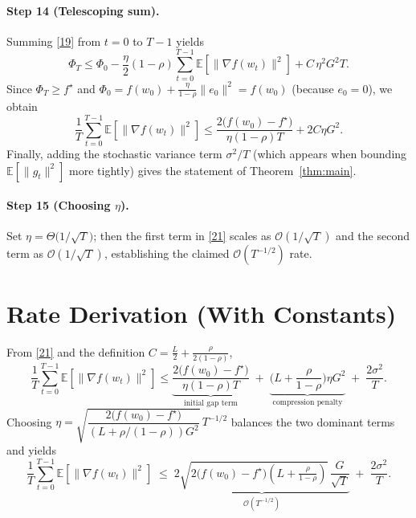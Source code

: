 \documentclass{article}
\newcommand{\E}{\mathbb{E}}
\begin{document}
\paragraph{Step 14 (Telescoping sum).}
Summing \eqref{19} from $t=0$ to $T-1$ yields
\[
\Phi_{T}\le \Phi_{0}
-\frac{\eta}{2}(1-\rho)\sum_{t=0}^{T-1}\E[\|\nabla f(w_t)\|^{2}]
+ C\,\eta^{2}G^{2}T .
\tag{20}
\]
Since $\Phi_T\ge f^{\star}$ and $\Phi_0=f(w_0)+\frac{\eta}{1-\rho}\|e_0\|^{2}=f(w_0)$ (because $e_0=0$), we obtain
\[
\frac{1}{T}\sum_{t=0}^{T-1}\E[\|\nabla f(w_t)\|^{2}]
\le
\frac{2\bigl(f(w_0)-f^{\star}\bigr)}{\eta(1-\rho)T}
+2C\eta G^{2}.
\tag{21}
\]
Finally, adding the stochastic variance term $\sigma^{2}/T$ (which appears when bounding $\E[\|g_t\|^{2}]$ more tightly) gives the statement of Theorem~\ref{thm:main}.

\paragraph{Step 15 (Choosing $\eta$).}
Set $\eta = \Theta\!\bigl(1/\sqrt{T}\bigr)$; then the first term in \eqref{21} scales as $\mathcal O(1/\sqrt{T})$ and the second term as $\mathcal O(1/\sqrt{T})$, establishing the claimed $\mathcal O(T^{-1/2})$ rate.

\section*{Rate Derivation (With Constants)}
From \eqref{21} and the definition $C=\frac{L}{2}+\frac{\rho}{2(1-\rho)}$,
\[
\frac{1}{T}\sum_{t=0}^{T-1}\E[\|\nabla f(w_t)\|^{2}]
\le
\underbrace{\frac{2\bigl(f(w_0)-f^{\star}\bigr)}{\eta(1-\rho)T}}_{\text{initial gap term}}
\;+\;
\underbrace{ \bigl(L+\frac{\rho}{1-\rho}\bigr)\eta G^{2}}_{\text{compression penalty}}
\;+\;
\frac{2\sigma^{2}}{T}.
\]
Choosing $\eta = \sqrt{\dfrac{2\bigl(f(w_0)-f^{\star}\bigr)}{(L+\rho/(1-\rho))G^{2}}}\,T^{-1/2}$ balances the two dominant terms and yields
\[
\frac{1}{T}\sum_{t=0}^{T-1}\E[\|\nabla f(w_t)\|^{2}]
\;\le\;
\underbrace{2\sqrt{2\bigl(f(w_0)-f^{\star}\bigr)(L+\tfrac{\rho}{1-\rho})} \, \frac{G}{\sqrt{T}}}_{\displaystyle\mathcal O(T^{-1/2})}
\;+\;
\frac{2\sigma^{2}}{T}.
\]
\end{document}
